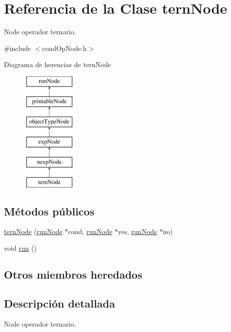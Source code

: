 \hypertarget{classternNode}{\section{Referencia de la Clase tern\-Node}
\label{classternNode}
}


Node operador ternario.  




{\ttfamily \#include $<$cond\-Op\-Node.\-h$>$}

Diagrama de herencias de tern\-Node\begin{figure}[H]
\begin{center}
\leavevmode
\includegraphics[height=6.000000cm]{classternNode}
\end{center}
\end{figure}
\subsection*{Métodos públicos}
\begin{DoxyCompactItemize}
\item 
\hyperlink{classternNode_abd4214c0157e53f60e538b04249545ad}{tern\-Node} (\hyperlink{classrunNode}{run\-Node} $\ast$cond, \hyperlink{classrunNode}{run\-Node} $\ast$yes, \hyperlink{classrunNode}{run\-Node} $\ast$no)
\item 
void \hyperlink{classternNode_a5ba4c96a74db8179e190d2ae60958be4}{run} ()
\end{DoxyCompactItemize}
\subsection*{Otros miembros heredados}


\subsection{Descripción detallada}
Node operador ternario. 

